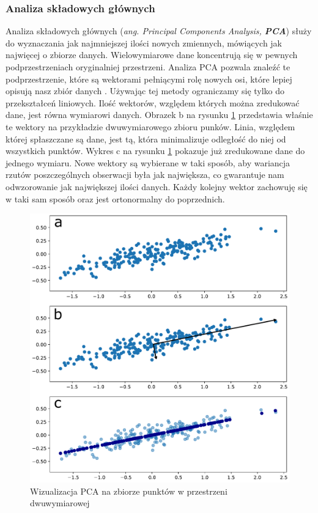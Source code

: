 \documentclass[a4paper,12pt,oneside]{book} %
\begin{document}
\subsubsection{Analiza składowych głównych}
Analiza składowych głównych (\textit{ang. Principal Components Analysis, \textbf{PCA}}) służy do wyznaczania jak najmniejszej ilości nowych zmiennych, mówiących jak najwięcej o zbiorze danych. Wielowymiarowe dane koncentrują się w pewnych podprzestrzeniach oryginalniej przestrzeni. Analiza PCA pozwala znaleźć te podprzestrzenie, które są wektorami pełniącymi rolę nowych osi, które lepiej opisują nasz zbiór danych \cite{redukcjawymiarow}. Używając tej metody ograniczamy się tylko do przekształceń liniowych. Ilość wektorów, względem których można zredukować dane, jest równa wymiarowi danych. Obrazek b na rysunku \ref{fig:pca} przedstawia właśnie te wektory na przykładzie dwuwymiarowego zbioru punków. Linia, względem której spłaszczane są dane, jest tą, która minimalizuje odległość do niej od wszystkich punktów. Wykres c na rysunku \ref{fig:pca} pokazuje już zredukowane dane do jednego wymiaru. Nowe wektory są wybierane w taki sposób, aby wariancja rzutów poszczególnych obserwacji była jak największa, co gwarantuje nam odwzorowanie jak największej ilości danych. Każdy kolejny wektor zachowuję się w taki sam sposób oraz jest ortonormalny do poprzednich.
\begin{figure}[h!]
	\centering
	\includegraphics[width=\textwidth]{pca.pdf}
	\caption{Wizualizacja PCA na zbiorze punktów w przestrzeni dwuwymiarowej}
	\label{fig:pca}
\end{figure}
\end{document}
